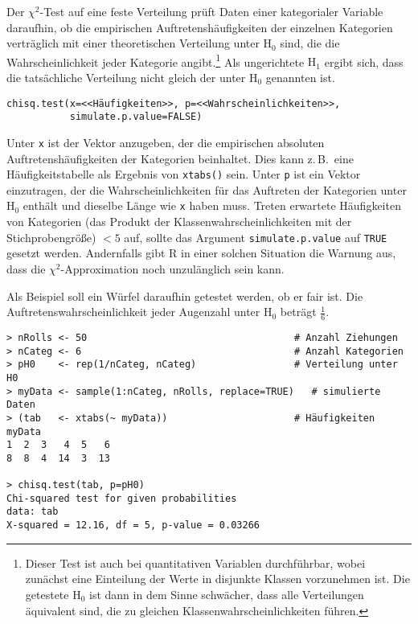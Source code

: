 Der $\chi^{2}$-Test auf eine feste Verteilung prüft Daten einer kategorialer Variable daraufhin, ob die empirischen Auftretenshäufigkeiten der einzelnen Kategorien verträglich mit einer theoretischen Verteilung unter $\text{H}_{0}$ sind, die die Wahrscheinlichkeit jeder Kategorie angibt.\footnote{Dieser Test ist auch bei quantitativen Variablen durchführbar, wobei zunächst eine Einteilung der Werte in disjunkte Klassen vorzunehmen ist. Die getestete $\text{H}_{0}$ ist dann in dem Sinne schwächer, dass alle Verteilungen äquivalent sind, die zu gleichen Klassenwahrscheinlichkeiten führen.} Als ungerichtete $\text{H}_{1}$ ergibt sich, dass die tatsächliche Verteilung nicht gleich der unter $\text{H}_{0}$ genannten ist.
\begin{lstlisting}
chisq.test(x=<<Häufigkeiten>>, p=<<Wahrscheinlichkeiten>>,
           simulate.p.value=FALSE)
\end{lstlisting}

Unter \lstinline!x! ist der Vektor anzugeben, der die empirischen absoluten Auftretenshäufigkeiten der Kategorien beinhaltet. Dies kann z.\,B.\ eine Häufigkeitstabelle als Ergebnis von \lstinline!xtabs()! sein. Unter \lstinline!p! ist ein Vektor einzutragen, der die Wahrscheinlichkeiten für das Auftreten der Kategorien unter $\text{H}_{0}$ enthält und dieselbe Länge wie \lstinline!x! haben muss. Treten erwartete Häufigkeiten von Kategorien (das Produkt der Klassenwahrscheinlichkeiten mit der Stichprobengröße) $< 5$ auf, sollte das Argument \lstinline!simulate.p.value! auf \lstinline!TRUE! gesetzt werden. Andernfalls gibt R in einer solchen Situation die Warnung aus, dass die $\chi^{2}$-Approximation noch unzulänglich sein kann.

Als Beispiel soll ein Würfel daraufhin getestet werden, ob er fair ist. Die Auftretenswahrscheinlichkeit jeder Augenzahl unter $\text{H}_{0}$ beträgt $\frac{1}{6}$.
\begin{lstlisting}
> nRolls <- 50                                    # Anzahl Ziehungen
> nCateg <- 6                                     # Anzahl Kategorien
> pH0    <- rep(1/nCateg, nCateg)                 # Verteilung unter H0
> myData <- sample(1:nCateg, nRolls, replace=TRUE)   # simulierte Daten
> (tab   <- xtabs(~ myData))                      # Häufigkeiten
myData
1  2  3   4  5   6
8  8  4  14  3  13

> chisq.test(tab, p=pH0)
Chi-squared test for given probabilities
data: tab
X-squared = 12.16, df = 5, p-value = 0.03266
\end{lstlisting}

